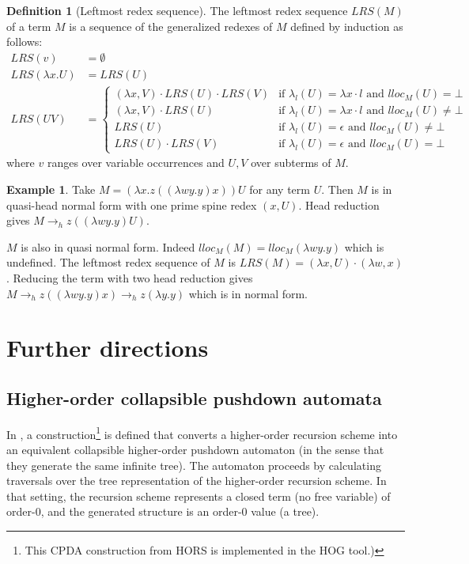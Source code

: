 \documentclass{article}
\theoremstyle{definition}
\newtheorem{definition}{Definition}[section]
\newtheorem{example}{Example}[section]
\begin{document}
\begin{definition}[Leftmost redex sequence]
The leftmost redex sequence $LRS(M)$ of a term $M$ is a sequence of the generalized redexes of $M$ defined by induction as follows:
\begin{align*}
LRS(v) &= \emptyset \\
LRS(\lambda x . U) &= LRS(U)\\
LRS(U V) &=
    \begin{cases}
        (\lambda x, V) \cdot LRS(U) \cdot LRS(V) & \mbox{if $\lambda_l(U) = \lambda x \cdot l$ and $lloc_M(U) =\bot$ } \\
        (\lambda x, V) \cdot  LRS(U) & \mbox{if $\lambda_l(U) = \lambda x \cdot l $ and $lloc_M(U) \neq \bot$} \\
        LRS(U) & \mbox{if $\lambda_l(U) = \epsilon$ and $lloc_M(U) \neq \bot$} \\
        LRS(U) \cdot LRS(V) & \mbox{if $\lambda_l(U) = \epsilon$ and $lloc_M(U) = \bot$}
    \end{cases}
\end{align*}
where $v$ ranges over variable occurrences and $U,V$ over subterms of $M$.
\end{definition}

\begin{example}
Take $M = (\lambda x . z ((\lambda w y . y)x)) U$ for any term $U$.
Then $M$ is in quasi-head normal form with one prime spine redex $(x,U)$.
Head reduction gives $M \rightarrow_h z ((\lambda w y. y) U)$.

$M$ is also in quasi normal form. Indeed $lloc_M(M) = lloc_M (\lambda w y . y)$ which is undefined.
The leftmost redex sequence of $M$ is $LRS(M) = (\lambda x, U) \cdot (\lambda w, x)$.
Reducing the term with two head reduction gives
$M \rightarrow_h z ((\lambda w y.y)x) \rightarrow_h z (\lambda y . y)$ which is in normal form.
\end{example}



\section{Further directions}

\subsection{Higher-order collapsible pushdown automata}

In \cite{Ong2006}, a construction\footnote{This CPDA construction from HORS is implemented in the HOG tool.)}
 is defined that converts a higher-order recursion scheme into an equivalent collapsible higher-order pushdown automaton (in the sense that they generate the same infinite tree). The automaton proceeds by calculating traversals over the tree representation of the higher-order recursion scheme. In that setting, the recursion scheme represents a closed term (no free variable) of order-$0$, and the generated structure is an order-$0$ value (a tree).
\end{document}

